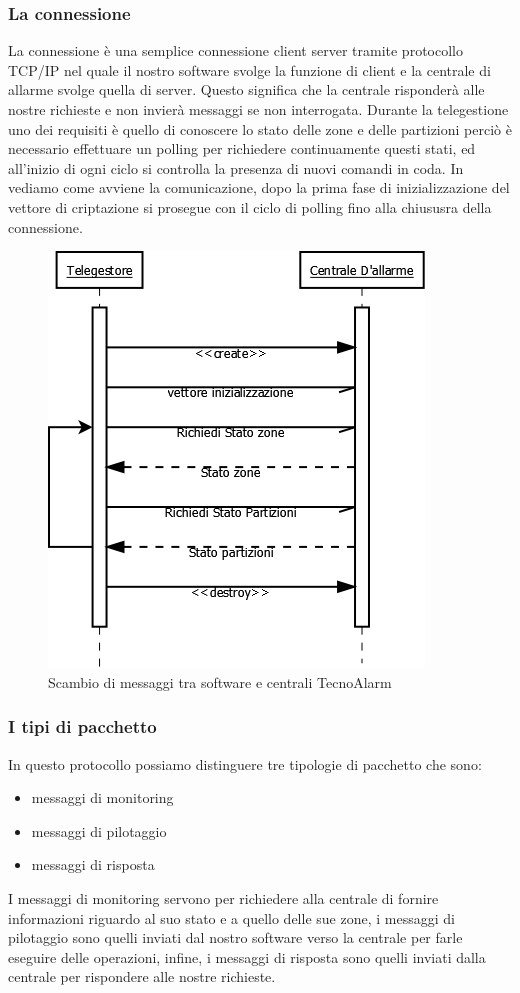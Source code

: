 \subsubsection{La connessione}
La connessione è una semplice connessione client server tramite protocollo TCP/IP nel quale il nostro software svolge la funzione di client e la centrale di allarme svolge quella di server. Questo significa che la centrale risponderà alle nostre richieste e non invierà messaggi se non interrogata. Durante la telegestione uno dei requisiti è quello di conoscere lo stato delle zone e delle partizioni perciò è necessario effettuare un polling per richiedere continuamente questi stati, ed all'inizio di ogni ciclo si controlla la presenza di nuovi comandi in coda.
In  vediamo come avviene la comunicazione, dopo la prima fase di inizializzazione del vettore di criptazione si prosegue con il ciclo di polling fino alla chiususra della connessione.
\begin{figure}
\centering
\includegraphics[width=0.7\linewidth]{pictures/contecno.png}
\caption{Scambio di messaggi tra software e centrali TecnoAlarm}\label{fig:contecno}	
\end{figure}
\subsubsection{I tipi di pacchetto}
In questo protocollo possiamo distinguere tre tipologie di pacchetto che sono:
\begin{itemize}
	\item messaggi di monitoring
	\item messaggi di pilotaggio
	\item messaggi di risposta
\end{itemize}
I messaggi di monitoring servono per richiedere alla centrale di fornire informazioni riguardo al suo stato e a quello delle sue zone, i messaggi di pilotaggio sono quelli inviati dal nostro software verso la centrale per farle eseguire delle operazioni, infine, i messaggi di risposta sono quelli inviati dalla centrale per rispondere alle nostre richieste.
